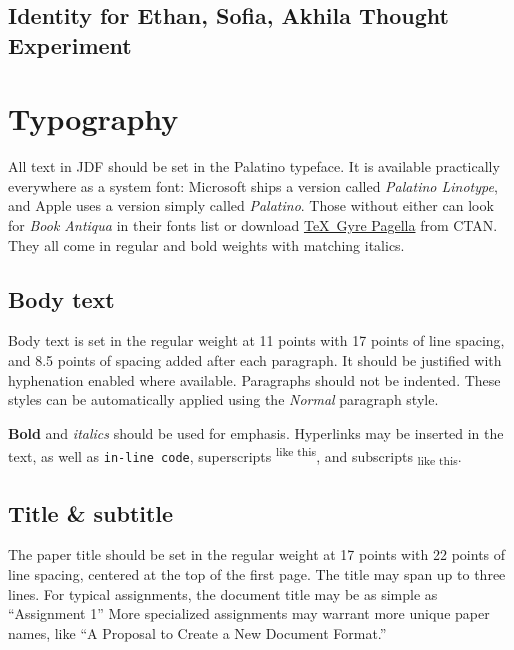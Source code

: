 \documentclass[
	letterpaper, %
]{jdf}
\begin{document}
\subsection{Identity for Ethan, Sofia, Akhila Thought Experiment}


\section{Typography}
All text in JDF should be set in the Palatino typeface. It is available practically everywhere as a system font: Microsoft ships a version called \emph{Palatino Linotype}, and Apple uses a version simply called \emph{Palatino}. Those without either can look for \emph{Book Antiqua} in their fonts list or download \href{https://www.ctan.org/tex-archive/fonts/tex-gyre/opentype}{\TeX\ Gyre Pagella} from CTAN. They all come in regular and bold weights with matching italics.

\subsection{Body text}
Body text is set in the regular weight at 11 points with 17 points of line spacing, and 8.5 points of spacing added after each paragraph. It should be justified with hyphenation enabled where available. Paragraphs should not be indented. These styles can be automatically applied using the \emph{Normal} paragraph style.

\textbf{Bold} and \textit{italics} should be used for emphasis. Hyperlinks may be inserted in the text, as well as {\tt in-line code}, superscripts\textsuperscript{ like this}, and subscripts\textsubscript{ like this}.

\subsection{Title \& subtitle}
The paper title should be set in the regular weight at 17 points with 22 points of line spacing, centered at the top of the first page. The title may span up to three lines. For typical assignments, the document title may be as simple as “Assignment 1” More specialized assignments may warrant more unique paper names, like “A Proposal to Create a New Document Format.”
\end{document}
